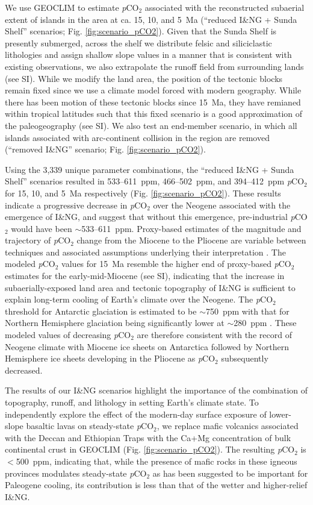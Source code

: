 \documentclass[11pt,letterpaper]{article}
\newcommand{\pCOtwo}{\textit{p}CO$_{2}$\xspace}
\begin{document}
We use GEOCLIM to estimate \pCOtwo associated with the reconstructed subaerial extent of islands in the area at ca. 15, 10, and 5~Ma (``reduced I\&NG + Sunda Shelf'' scenarios; Fig. \ref{fig:scenario_pCO2}). Given that the Sunda Shelf is presently submerged, across the shelf we distribute felsic and siliciclastic lithologies and assign shallow slope values in a manner that is consistent with existing observations, we also extrapolate the runoff field from surrounding lands (see SI). While we modify the land area, the position of the tectonic blocks remain fixed since we use a climate model forced with modern geography. While there has been motion of these tectonic blocks since 15~Ma, they have remianed within tropical latitudes such that this fixed scenario is a good approximation of the paleogeography (see SI). We also test an end-member scenario, in which all islands associated with arc-continent collision in the region are removed (``removed I\&NG'' scenario; Fig. \ref{fig:scenario_pCO2}).

Using the 3,339 unique parameter combinations, the ``reduced I\&NG + Sunda Shelf'' scenarios resulted in 533--611~ppm, 466--502~ppm, and 394--412~ppm \pCOtwo for 15, 10, and 5~Ma respectively (Fig. \ref{fig:scenario_pCO2}). These results indicate a progressive decrease in \pCOtwo over the Neogene associated with the emergence of I\&NG, and suggest that without this emergence, pre-industrial \pCOtwo would have been $\sim$533--611~ppm. Proxy-based estimates of the magnitude and trajectory of \pCOtwo change from the Miocene to the Pliocene are variable between techniques and associated assumptions underlying their interpretation \cite{Foster2017a, Mejia2017a, Ji2018a}. The modeled \pCOtwo values for 15~Ma resemble the higher end of proxy-based \pCOtwo estimates for the early-mid-Miocene (see SI), indicating that the increase in subaerially-exposed land area and tectonic topography of I\&NG is sufficient to explain long-term cooling of Earth's climate over the Neogene. The \pCOtwo threshold for Antarctic glaciation is estimated to be $\sim$750~ppm with that for Northern Hemisphere glaciation being significantly lower at $\sim$280~ppm \cite{DeConto2008a}. These modeled values of decreasing \pCOtwo are therefore consistent with the record of Neogene climate with Miocene ice sheets on Antarctica followed by Northern Hemisphere ice sheets developing in the Pliocene as \pCOtwo subsequently decreased.

The results of our I\&NG scenarios highlight the importance of the combination of topography, runoff, and lithology in setting Earth's climate state. To independently explore the effect of the modern-day surface exposure of lower-slope basaltic lavas on steady-state \pCOtwo \cite{Kent2008a, Kent2013a}, we replace mafic volcanics associated with the Deccan and Ethiopian Traps with the Ca+Mg concentration of bulk continental crust in GEOCLIM (Fig. \ref{fig:scenario_pCO2}). The resulting \pCOtwo is $<$500~ppm, indicating that, while the presence of mafic rocks in these igneous provinces modulates steady-state \pCOtwo as has been suggested to be important for Paleogene cooling\cite{Kent2008a, Kent2013a}, its contribution is less than that of the wetter and higher-relief I\&NG.
\end{document}
